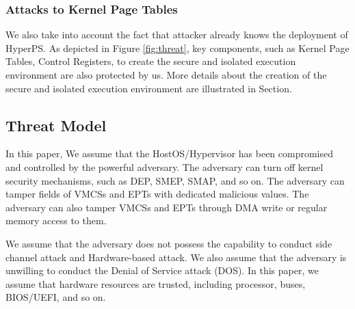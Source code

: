 \subsubsection{Attacks to Kernel Page Tables}
We also take into account the fact that attacker already knows the deployment of HyperPS. As depicted in Figure \ref{fig:threat}, key components, such as Kernel Page Tables, Control Registers, to create the secure and isolated execution environment are also protected by us. More details about the creation of the secure and isolated execution environment are illustrated in Section. 
 


\subsection{Threat Model} \label{sub:threatmodel}
In this paper, 
We assume that the HostOS/Hypervisor has been compromised and controlled by the powerful adversary. The adversary can turn off kernel security mechanisms, such as DEP, SMEP, SMAP, and so on. The adversary can tamper fields of VMCSs and EPTs with dedicated malicious values. The adversary can also tamper VMCSs and EPTs through DMA write or regular memory access to them.  

We assume that the adversary does not possess the capability to conduct side channel attack and Hardware-based attack. We also assume that the adversary is unwilling to conduct the Denial of Service attack (DOS). In this paper, we assume that hardware resources are trusted, including processor, buses, BIOS/UEFI, and so on. 





















